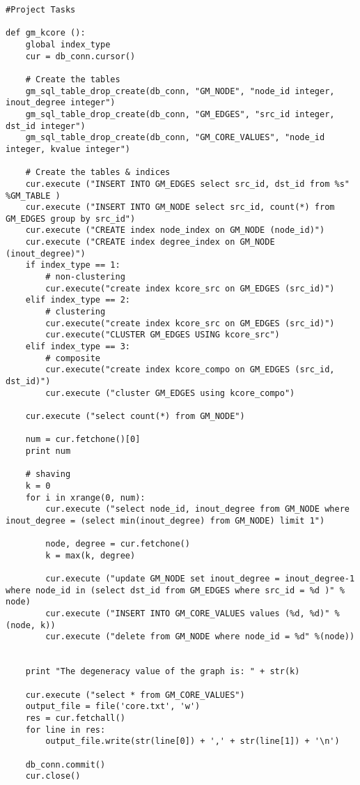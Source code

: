 \documentclass[11pt]{article}
\begin{document}
\begin{lstlisting}
#Project Tasks
 
def gm_kcore ():
    global index_type
    cur = db_conn.cursor() 

    # Create the tables
    gm_sql_table_drop_create(db_conn, "GM_NODE", "node_id integer, inout_degree integer")
    gm_sql_table_drop_create(db_conn, "GM_EDGES", "src_id integer, dst_id integer")
    gm_sql_table_drop_create(db_conn, "GM_CORE_VALUES", "node_id integer, kvalue integer") 

    # Create the tables & indices
    cur.execute ("INSERT INTO GM_EDGES select src_id, dst_id from %s" %GM_TABLE )
    cur.execute ("INSERT INTO GM_NODE select src_id, count(*) from GM_EDGES group by src_id")
    cur.execute ("CREATE index node_index on GM_NODE (node_id)")
    cur.execute ("CREATE index degree_index on GM_NODE (inout_degree)")
    if index_type == 1:
        # non-clustering           
        cur.execute("create index kcore_src on GM_EDGES (src_id)")
    elif index_type == 2:
        # clustering
        cur.execute("create index kcore_src on GM_EDGES (src_id)")
        cur.execute("CLUSTER GM_EDGES USING kcore_src")
    elif index_type == 3:
        # composite
        cur.execute("create index kcore_compo on GM_EDGES (src_id, dst_id)")
        cur.execute ("cluster GM_EDGES using kcore_compo")
    
    cur.execute ("select count(*) from GM_NODE")

    num = cur.fetchone()[0]
    print num

    # shaving
    k = 0
    for i in xrange(0, num):
        cur.execute ("select node_id, inout_degree from GM_NODE where inout_degree = (select min(inout_degree) from GM_NODE) limit 1")

        node, degree = cur.fetchone()
        k = max(k, degree)

        cur.execute ("update GM_NODE set inout_degree = inout_degree-1 where node_id in (select dst_id from GM_EDGES where src_id = %d )" % node)
        cur.execute ("INSERT INTO GM_CORE_VALUES values (%d, %d)" %(node, k))
        cur.execute ("delete from GM_NODE where node_id = %d" %(node))


    print "The degeneracy value of the graph is: " + str(k)

    cur.execute ("select * from GM_CORE_VALUES")
    output_file = file('core.txt', 'w')
    res = cur.fetchall()
    for line in res:
        output_file.write(str(line[0]) + ',' + str(line[1]) + '\n')

    db_conn.commit()
    cur.close()


\end{lstlisting}
\end{document}
